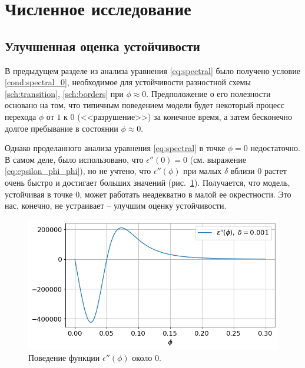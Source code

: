 
\section{Численное исследование}

\subsection{Улучшенная оценка устойчивости}

В предыдущем разделе из анализа уравнения \eqref{eq:spectral} было получено условие \eqref{cond:spectral_0}, необходимое для устойчивости разностной схемы \eqref{sch:transition}, \eqref{sch:borders} при $\phi \approx 0$. Предположение о его полезности основано на том, что типичным поведением модели будет некоторый процесс перехода $\phi$ от $1$ к $0$ (<<разрушение>>) за конечное время, а затем бесконечно долгое пребывание в состоянии $\phi \approx 0$.

Однако проделанного анализа уравнения \eqref{eq:spectral} в точке $\phi = 0$ недостаточно. В самом деле, было использовано, что $\epsilon''(0) = 0$ (см. выражение \eqref{eq:epsilon_phi_phi}), но не учтено, что $\epsilon''(\phi)$ при малых $\delta$ вблизи $0$ растет очень быстро и достигает больших значений (рис.~\ref{fig:eps_phi_phi}). Получается, что модель, устойчивая в точке $0$, может работать неадекватно в малой ее окрестности. Это нас, конечно, не устраивает -- улучшим оценку устойчивости.

\begin{figure}[!tp]
    \centering
    \includegraphics[width=\textwidth]{figures/eps_phi_phi.png}
    \vspace{-0.7cm}
    \caption{Поведение функции $\epsilon''(\phi)$ около $0$.}
    \label{fig:eps_phi_phi}
\end{figure}

